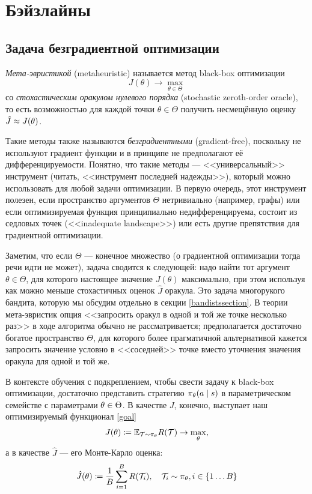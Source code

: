 \section{Бэйзлайны}

\subsection{Задача безградиентной оптимизации}

\begin{definition}
\emph{Мета-эвристикой} (metaheuristic) называется метод black-box оптимизации
$$J(\theta) \to \max_{\theta \in \Theta}$$
со \emph{стохастическим оракулом нулевого порядка} (stochastic zeroth-order oracle), то есть возможностью для каждой точки $\theta \in \Theta$ получить несмещённую оценку $\hat{J} \HM\approx J(\theta)$.
\end{definition}

Такие методы также называются \emph{безградиентными} (gradient-free), поскольку не используют градиент функции и в принципе не предполагают её дифференцируемости. Понятно, что такие методы --- <<универсальный>> инструмент (читать, <<инструмент последней надежды>>), который можно использовать для любой задачи оптимизации. В первую очередь, этот инструмент полезен, если пространство аргументов $\Theta$ нетривиально (например, графы) или если оптимизируемая функция принципиально недифференцируема, состоит из седловых точек (<<inadequate landscape>>) или есть другие препятствия для градиентной оптимизации.

Заметим, что если $\Theta$ --- конечное множество (о градиентной оптимизации тогда речи идти не может), задача сводится к следующей: надо найти тот аргумент $\theta \in \Theta$, для которого настоящее значение $J(\theta)$ максимально, при этом используя как можно меньше стохастичных оценок $\hat{J}$ оракула. Это задача многорукого бандита, которую мы обсудим отдельно в секции \ref{bandistssection}. В теории мета-эвристик опция <<запросить оракул в одной и той же точке несколько раз>> в ходе алгоритма обычно не рассматривается; предполагается достаточно богатое пространство $\Theta$, для которого более прагматичной альтернативой кажется запросить значение условно в <<соседней>> точке вместо уточнения значения оракула для одной и той же.

В контексте обучения с подкреплением, чтобы свести задачу к black-box оптимизации, достаточно представить стратегию $\pi_\theta(a \HM\mid s)$ в параметрическом семействе с параметрами $\theta \HM\in \Theta$. В качестве $J$, конечно, выступает наш оптимизируемый функционал \eqref{goal}
$$J(\theta) \coloneqq \mathbb{E}_{\mathcal{T} \sim \pi_\theta} R(\mathcal{T}) \to \max_{\theta},$$
а в качестве $\hat{J}$ --- его Монте-Карло оценка:
$$\hat{J}(\theta) \coloneqq \frac{1}{B}\sum_{i=1}^{B} R(\mathcal{T}_i), \quad \mathcal{T}_i \sim \pi_\theta, i \in \{1 \dots B \}$$

